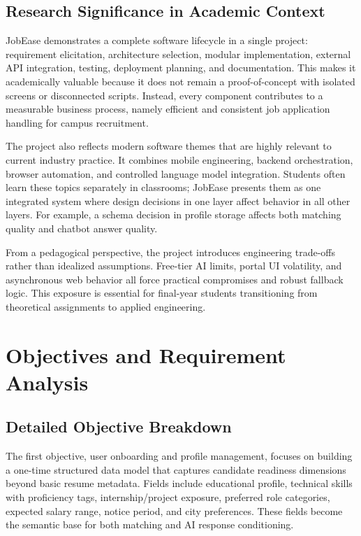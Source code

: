 \documentclass[12pt,a4paper,oneside]{report}
\begin{document}
\section{Research Significance in Academic Context}
JobEase demonstrates a complete software lifecycle in a single project: requirement elicitation, architecture selection, modular implementation, external API integration, testing, deployment planning, and documentation. This makes it academically valuable because it does not remain a proof-of-concept with isolated screens or disconnected scripts. Instead, every component contributes to a measurable business process, namely efficient and consistent job application handling for campus recruitment.

The project also reflects modern software themes that are highly relevant to current industry practice. It combines mobile engineering, backend orchestration, browser automation, and controlled language model integration. Students often learn these topics separately in classrooms; JobEase presents them as one integrated system where design decisions in one layer affect behavior in all other layers. For example, a schema decision in profile storage affects both matching quality and chatbot answer quality.

From a pedagogical perspective, the project introduces engineering trade-offs rather than idealized assumptions. Free-tier AI limits, portal UI volatility, and asynchronous web behavior all force practical compromises and robust fallback logic. This exposure is essential for final-year students transitioning from theoretical assignments to applied engineering.

\chapter{Objectives and Requirement Analysis}
\section{Detailed Objective Breakdown}
The first objective, user onboarding and profile management, focuses on building a one-time structured data model that captures candidate readiness dimensions beyond basic resume metadata. Fields include educational profile, technical skills with proficiency tags, internship/project exposure, preferred role categories, expected salary range, notice period, and city preferences. These fields become the semantic base for both matching and AI response conditioning.
\end{document}
